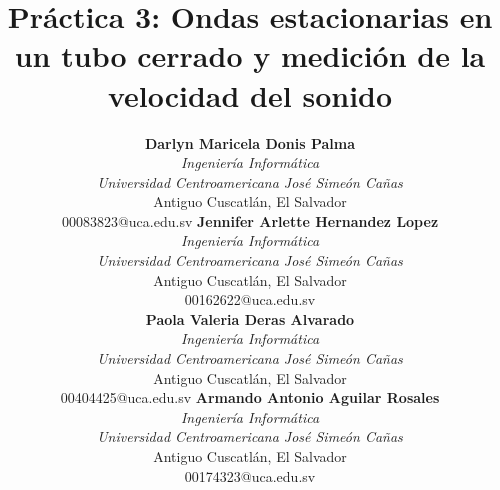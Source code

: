 \documentclass[conference]{Plantilla_LATEX/IEEEtran}
\begin{document}
\title{Práctica 3: Ondas estacionarias en un tubo cerrado y medición de la velocidad del sonido}

\author{
\begin{tabular}{@{}c@{\hspace{0.07\textwidth}}c@{}}
\parbox[t]{0.43\textwidth}{\centering
  {\normalsize\textbf{Darlyn Maricela Donis Palma}}\\
  {\small \textit{Ingeniería Informática}\\
  \textit{Universidad Centroamericana José Simeón Cañas}\\
  Antiguo Cuscatlán, El Salvador\\
  00083823@uca.edu.sv}
}
&
\parbox[t]{0.43\textwidth}{\centering
  {\normalsize\textbf{Jennifer Arlette Hernandez Lopez}}\\
  {\small \textit{Ingeniería Informática}\\
  \textit{Universidad Centroamericana José Simeón Cañas}\\
  Antiguo Cuscatlán, El Salvador\\
  00162622@uca.edu.sv}
}\\[10.0ex]
\parbox[t]{0.43\textwidth}{\centering
  {\normalsize\textbf{Paola Valeria Deras Alvarado}}\\
  {\small \textit{Ingeniería Informática}\\
  \textit{Universidad Centroamericana José Simeón Cañas}\\
  Antiguo Cuscatlán, El Salvador\\
  00404425@uca.edu.sv}
}
&
\parbox[t]{0.43\textwidth}{\centering
  {\normalsize\textbf{Armando Antonio Aguilar Rosales}}\\
  {\small \textit{Ingeniería Informática}\\
  \textit{Universidad Centroamericana José Simeón Cañas}\\
  Antiguo Cuscatlán, El Salvador\\
  00174323@uca.edu.sv}
}
\end{tabular}
}

\maketitle












\end{document}
